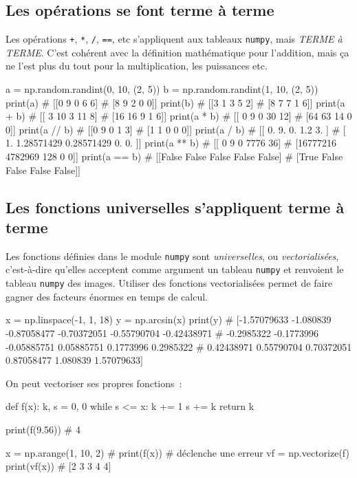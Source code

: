 \documentclass[10pt,fleqn]{article} %
\begin{document}
\subsection{Les opérations se font terme à terme}
\label{operations}
Les opérations \texttt{+}, \texttt{*}, \texttt{/}, \texttt{==}, etc s'appliquent aux tableaux
\texttt{numpy}, mais \emph{TERME à TERME}. C'est cohérent avec la
définition mathématique pour l'addition, mais ça ne l'est plus du tout
pour la multiplication, les puissances etc.
\begin{py}
\begin{multicols}{2}
\begin{python}
a = np.random.randint(0, 10, (2, 5))
b = np.random.randint(1, 10, (2, 5))
print(a)
# [[0 9 0 6 6]
#  [8 9 2 0 0]]
print(b)
# [[3 1 3 5 2]
#  [8 7 7 1 6]]
print(a + b)
# [[ 3 10  3 11  8]
#  [16 16  9  1  6]]
print(a * b)
# [[ 0  9  0 30 12]
#  [64 63 14  0  0]]
print(a // b)
# [[0 9 0 1 3]
#  [1 1 0 0 0]]
print(a / b)
# [[ 0.          9.          0.          1.2         3.        ]
#  [ 1.          1.28571429  0.28571429  0.          0.        ]]
print(a ** b)
# [[       0        9        0     7776       36]
#  [16777216  4782969      128        0        0]]  
print(a == b)
# [[False False False False False]
#  [True False False False False]]
\end{python}
\end{multicols}
\end{py}

\subsection{Les fonctions universelles s'appliquent terme à terme}
Les fonctions définies dans le module \texttt{numpy} sont
\emph{universelles}, ou \emph{vectorialisées}, c'est-à-dire qu'elles acceptent comme argument un
tableau \texttt{numpy} et renvoient le tableau \texttt{numpy} des
images. Utiliser des fonctions vectorialisées permet de faire gagner
des facteurs énormes en temps de calcul.

\begin{python}
x = np.linspace(-1, 1, 18)
y = np.arcsin(x)
print(y)
# [-1.57079633 -1.080839   -0.87058477 -0.70372051 -0.55790704 -0.42438971
#  -0.2985322  -0.1773996  -0.05885751  0.05885751  0.1773996   0.2985322
#   0.42438971  0.55790704  0.70372051  0.87058477  1.080839    1.57079633]  
\end{python}
\begin{multicols}{2}
On peut vectoriser ses propres fonctions~:
\begin{python}
def f(x):
    k, s = 0, 0
    while s <= x:
        k += 1
        s += k
    return k

print(f(9.56))
# 4

x = np.arange(1, 10, 2)
# print(f(x)) # déclenche une erreur
vf = np.vectorize(f)
print(vf(x))
# [2 3 3 4 4]  
\end{python}
\end{multicols}
\end{document}
